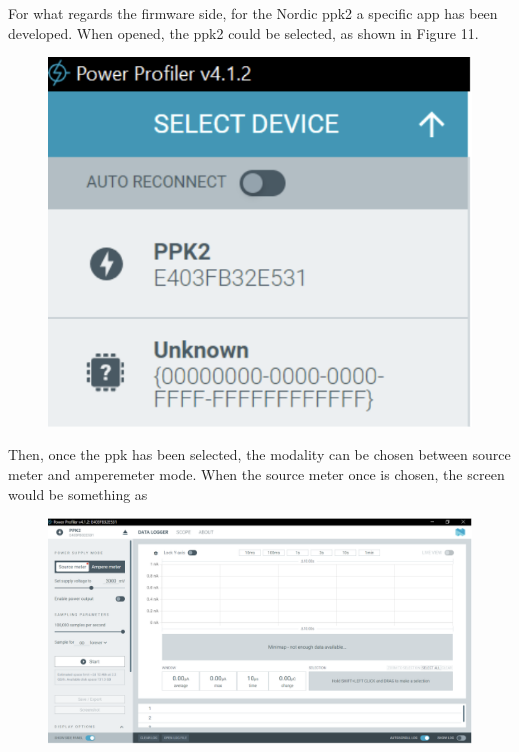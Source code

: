 \documentclass{Configuration_Files/PoliMi3i_thesis}
\begin{document}
For what regards the firmware side, for the Nordic ppk2 a specific app has been developed. When opened, the ppk2 could be selected, as shown in Figure 11.
\begin{figure}[H]
    \centering
    \includegraphics[scale=0.3]{Test_Procedure/11.png}
    \label{fig:direct_communication_board_PC}
\end{figure}

Then, once the ppk has been selected, the modality can be chosen between source meter and amperemeter mode. 
When the source meter once is chosen, the screen would be something as 
\begin{figure}[H]
    \centering
    \includegraphics[scale=0.3]{Test_Procedure/12.png}
    \label{fig:direct_communication_board_PC}
\end{figure}
\end{document}
